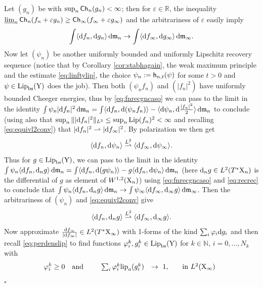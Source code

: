 \documentclass[11pt]{article}
\numberwithin{equation}{section}
\newenvironment{idea}{\removelastskip\par\medskip   %
\noindent{\em Idea of the proof} \rm}{\penalty-20\null\hfill$\square$\par\medbreak}
\newcommand{\N}{\mathbb{N}}
\newcommand{\R}{\mathbb{R}}
\newcommand{\X}{{\rm X}}
\newcommand{\Y}{{\rm Y}}
\newcommand{\mm}{{\mathfrak m}}
\newcommand{\ch}{{\sf Ch}}
\renewcommand{\d}{{\rm d}}
\newcommand{\Lip}{{\rm Lip}}
\newcommand{\lipa}{{\rm lip}_a}
\newcommand{\limi}{\varliminf}
\newcommand{\bs}{{\rm bs}}
\newcommand{\weakto}{\rightharpoonup}
\newcommand{\eps}{\varepsilon}
\newcommand{\h}{{\sf h}} %
\newcommand\la{\langle}
\newcommand\ra{\rangle}
\begin{document}
\begin{idea}
Let $(g_n)$ be  with $\sup_n\ch_n(g_n)<\infty$; then for $\eps\in\R$,  the inequality $\limi_n\ch_n(f_n+\eps g_n)\geq\ch_\infty(f_\infty+\eps g_\infty)$ and the arbitrariness of $\eps$  easily imply 
\begin{equation}
\label{eq:fnrecgncaso}
\int \la\d f_n,\d g_n\ra\,\d\mm_n\to \int \la\d f_\infty,\d g_\infty\ra\,\d\mm_\infty.
\end{equation}
Now let $(\psi_n)$ be another uniformly bounded and uniformly Lipschitz recovery sequence (notice that by Corollary \ref{cor:stabhagain}, the weak maximum principle and the estimate \eqref{eq:linftylip}, the choice $\psi_n:=\h_{n,t}(\psi)$ for some $t>0$ and $\psi\in\Lip_\bs(\Y)$ does the job). Then both $(\psi_nf_n)$ and $(|f_n|^2)$ have uniformly bounded Cheeger energies, thus by \eqref{eq:fnrecgncaso} we can pass to the limit in the identity $\int\psi_n|\d f_n|^2\,\d\mm_n=\int\la\d f_n,\d(\psi_n f_n)\ra-\la\d \psi_n,\d\tfrac{|f_n|^2}2\ra\,\d\mm_n$ to conclude (using also that $\sup_n\||\d f_n|^2\|_{L^2}\leq\sup_n\Lip(f_n)^2<\infty$ and recalling \eqref{eq:equivl2conv}) that $|\d f_n|^2\weakto |\d f_\infty|^2$. By polarization we then get
\begin{equation}
\label{eq:recrec}
\la\d f_n,\d\psi_n\ra\stackrel{L^2}\weakto \la\d f_\infty,\d\psi_\infty\ra. %
\end{equation}
Thus for $g\in\Lip_\bs(\Y)$, we can pass to the limit in the identity $\int \psi_n\la \d f_n,\d_ng\ra\,\d\mm_n=\int \la\d f_n,\d(g\psi_n)\ra- g\la\d f_n,\d\psi_n\ra\,\d\mm_n$ (here $\d_ng\in L^2(T^*\X_n)$ is the differential of $g$ as element of $W^{1,2}(\X_n)$) using \eqref{eq:fnrecgncaso} and \eqref{eq:recrec} to conclude that $\int \psi_n\la \d f_n,\d_ng\ra\,\d\mm_n\to \int \psi_\infty\la \d f_\infty,\d_\infty g\ra\,\d\mm_\infty$. Then the arbitrariness of $(\psi_n)$ and \eqref{eq:equivl2conv} give
\begin{equation}
\label{eq:fatto}
\la \d f_n,\d_ng\ra\stackrel{L^2}\weakto \la \d f_\infty,\d_\infty g\ra.
\end{equation}
Now approximate  $\frac{\d f_\infty}{|\d f_\infty|}\in L^2(T^*\X_\infty)$ with 1-forms of the kind $\sum_i\varphi_i\d g_i$ and then recall  \eqref{eq:perdenslip} to find functions  $\varphi_i^k,g_i^k\in \Lip_\bs(\Y)$ for $k\in\N$, $i=0,\ldots, N_k$ with  
\begin{equation}
\label{eq:diciamochece}
\varphi_i^k\geq0\quad\text{and}\qquad
\begin{array}{lll}
 \sum_i\varphi_{i}^k\lipa( g^k_i)&\to\ 1,&\quad\text{in $L^2(\X_\infty)$}\\  

\end{array}
\end{equation}
\end{idea}
\end{document}
